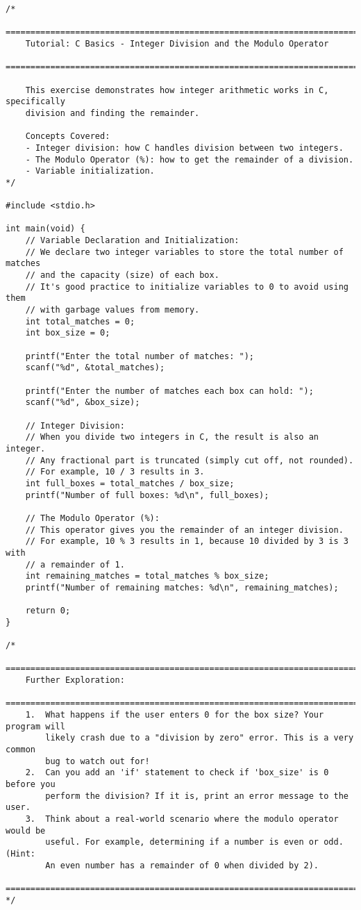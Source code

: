 \documentclass[11pt]{book}
\begin{document}
\begin{verbatim}
/*
    ================================================================================
    Tutorial: C Basics - Integer Division and the Modulo Operator
    ================================================================================

    This exercise demonstrates how integer arithmetic works in C, specifically
    division and finding the remainder.

    Concepts Covered:
    - Integer division: how C handles division between two integers.
    - The Modulo Operator (%): how to get the remainder of a division.
    - Variable initialization.
*/

#include <stdio.h>

int main(void) {
    // Variable Declaration and Initialization:
    // We declare two integer variables to store the total number of matches
    // and the capacity (size) of each box.
    // It's good practice to initialize variables to 0 to avoid using them
    // with garbage values from memory.
    int total_matches = 0;
    int box_size = 0;

    printf("Enter the total number of matches: ");
    scanf("%d", &total_matches);

    printf("Enter the number of matches each box can hold: ");
    scanf("%d", &box_size);

    // Integer Division:
    // When you divide two integers in C, the result is also an integer.
    // Any fractional part is truncated (simply cut off, not rounded).
    // For example, 10 / 3 results in 3.
    int full_boxes = total_matches / box_size;
    printf("Number of full boxes: %d\n", full_boxes);

    // The Modulo Operator (%):
    // This operator gives you the remainder of an integer division.
    // For example, 10 % 3 results in 1, because 10 divided by 3 is 3 with
    // a remainder of 1.
    int remaining_matches = total_matches % box_size;
    printf("Number of remaining matches: %d\n", remaining_matches);

    return 0;
}

/*
    ================================================================================
    Further Exploration:
    ================================================================================
    1.  What happens if the user enters 0 for the box size? Your program will
        likely crash due to a "division by zero" error. This is a very common
        bug to watch out for!
    2.  Can you add an 'if' statement to check if 'box_size' is 0 before you
        perform the division? If it is, print an error message to the user.
    3.  Think about a real-world scenario where the modulo operator would be
        useful. For example, determining if a number is even or odd. (Hint:
        An even number has a remainder of 0 when divided by 2).
    ================================================================================
*/

\end{verbatim}
\end{document}
